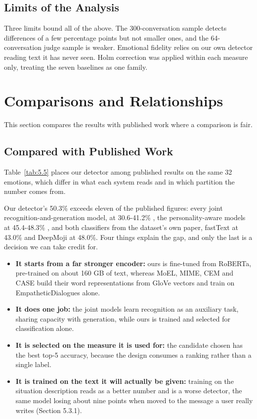 \subsection{Limits of the Analysis}
\label{sec:5.4.7}

Three limits bound all of the above. The 300-conversation sample detects differences of a few percentage points but not smaller ones, and the 64-conversation judge sample is weaker. Emotional fidelity relies on our own detector reading text it has never seen. Holm correction was applied within each measure only, treating the seven baselines as one family.

\section{Comparisons and Relationships}
\label{sec:5.5}

This section compares the results with published work where a comparison is fair.

\subsection{Compared with Published Work}
\label{sec:5.5.1}

Table~\ref{tab:5.5} places our detector among published results on the same 32 emotions, which differ in what each system reads and in which partition the number comes from.

Our detector's 50.3\% exceeds eleven of the published figures: every joint recognition-and-generation model, at 30.6-41.2\% \cite{lin2019moel,majumder2020mime,sabour2022cem,zhou2023case}, the personality-aware models at 45.4-48.3\% \cite{wu2025traits}, and both classifiers from the dataset's own paper, fastText at 43.0\% and DeepMoji at 48.0\%. Four things explain the gap, and only the last is a decision we can take credit for.

\begin{itemize}
\item\textbf{It starts from a far stronger encoder:} ours is fine-tuned from RoBERTa, pre-trained on about 160 GB of text, whereas MoEL, MIME, CEM and CASE build their word representations from GloVe vectors and train on EmpatheticDialogues alone.

\item\textbf{It does one job:} the joint models learn recognition as an auxiliary task, sharing capacity with generation, while ours is trained and selected for classification alone.

\item\textbf{It is selected on the measure it is used for: }the candidate chosen has the best top-5 accuracy, because the design consumes a ranking rather than a single label.

\item\textbf{It is trained on the text it will actually be given: }training on the situation description reads as a better number and is a worse detector, the same model losing about nine points when moved to the message a user really writes (Section 5.3.1).
\end{itemize}

